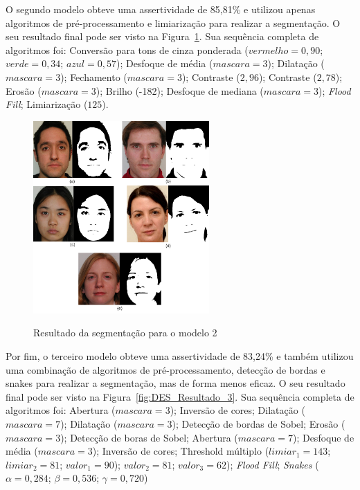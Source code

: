 \documentclass[12pt,oneside,a4paper,english,french,spanish,brazil,]{abntex2}
\begin{document}
O segundo modelo obteve uma assertividade de 85,81\% e utilizou apenas algoritmos de pré-processamento e limiarização para realizar a segmentação. O seu resultado final pode ser visto na Figura~\ref{fig:DES_Resultado_2}. Sua sequência completa de algoritmos foi: Conversão para tons de cinza ponderada (\(vermelho = 0,90\); \(verde = 0,34\); \(azul = 0,57\)); Desfoque de média (\(mascara=3\)); Dilatação (\(mascara=3\)); Fechamento (\(mascara=3\)); Contraste (\(2,96\)); Contraste (\(2,78\)); Erosão (\(mascara=3\)); Brilho (-182); Desfoque de mediana (\(mascara=3\)); \textit{Flood Fill}; Limiarização (\(125\)).

\begin{figure}[ht]
\centering
\caption{Resultado da segmentação para o modelo 2}
\includegraphics[width=0.6\textwidth]{imagens/DES_Resultado_2.pdf}
\sourceAuthor{}
\label{fig:DES_Resultado_2}
\end{figure}

Por fim, o terceiro modelo obteve uma assertividade de 83,24\% e também utilizou uma combinação de algoritmos de pré-processamento, detecção de bordas e snakes para realizar a segmentação, mas de forma menos eficaz. O seu resultado final pode ser visto na Figura~\ref{fig:DES_Resultado_3}. Sua sequência completa de algoritmos foi: Abertura (\(mascara=3\)); Inversão de cores; Dilatação  (\(mascara=7\)); Dilatação (\(mascara=3\)); Detecção de bordas de Sobel; Erosão (\(mascara=3\)); Detecção de boras de Sobel; Abertura (\(mascara=7\)); Desfoque de média (\(mascara=3\)); Inversão de cores; Threshold múltiplo (\(limiar_1=143\); \(limiar_2=81\); \(valor_1=90\)); \(valor_2=81\); \(valor_3=62\)); \textit{Flood Fill}; \textit{Snakes} (\(\alpha = 0,284\); \(\beta = 0,536\); \(\gamma = 0,720\))
\end{document}
